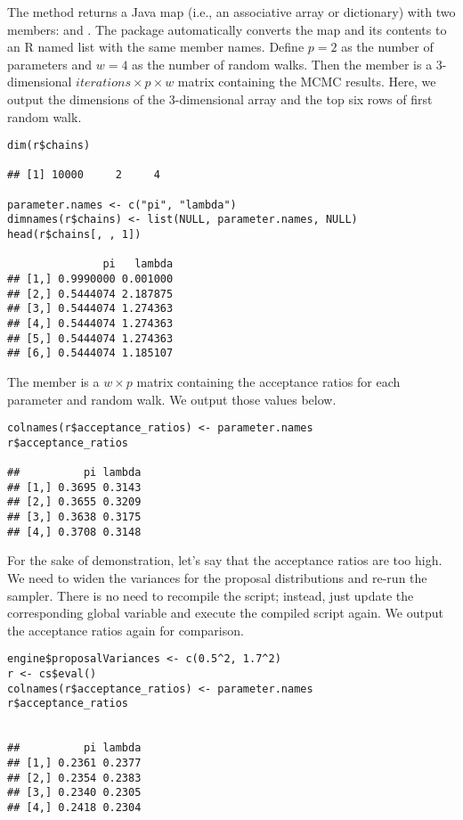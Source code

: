 The  method returns a Java map (i.e., an associative array or dictionary) with two members:  and . The  package automatically converts the map and its contents to an R named list with the same member names. Define $p = 2$ as the number of parameters and $w = 4$ as the number of random walks. Then the  member is a 3-dimensional $iterations \times p \times w$ matrix containing the MCMC results. Here, we output the dimensions of the 3-dimensional array and the top six rows of first random walk.

\begin{verbatim}
dim(r$chains)

## [1] 10000     2     4

parameter.names <- c("pi", "lambda")
dimnames(r$chains) <- list(NULL, parameter.names, NULL)
head(r$chains[, , 1])

               pi   lambda
## [1,] 0.9990000 0.001000
## [2,] 0.5444074 2.187875
## [3,] 0.5444074 1.274363
## [4,] 0.5444074 1.274363
## [5,] 0.5444074 1.274363
## [6,] 0.5444074 1.185107
\end{verbatim}

The  member is a $w \times p$ matrix containing the acceptance ratios for each parameter and random walk. We output those values below.

\begin{verbatim}
colnames(r$acceptance_ratios) <- parameter.names
r$acceptance_ratios

##          pi lambda
## [1,] 0.3695 0.3143
## [2,] 0.3655 0.3209
## [3,] 0.3638 0.3175
## [4,] 0.3708 0.3148
\end{verbatim}

For the sake of demonstration, let's say that the acceptance ratios are too high. We need to widen the variances for the proposal distributions and re-run the sampler. There is no need to recompile the script; instead, just update the corresponding global variable and execute the compiled script again. We output the acceptance ratios again for comparison.

\begin{verbatim}
engine$proposalVariances <- c(0.5^2, 1.7^2)
r <- cs$eval()
colnames(r$acceptance_ratios) <- parameter.names
r$acceptance_ratios


##          pi lambda
## [1,] 0.2361 0.2377
## [2,] 0.2354 0.2383
## [3,] 0.2340 0.2305
## [4,] 0.2418 0.2304
\end{verbatim}

